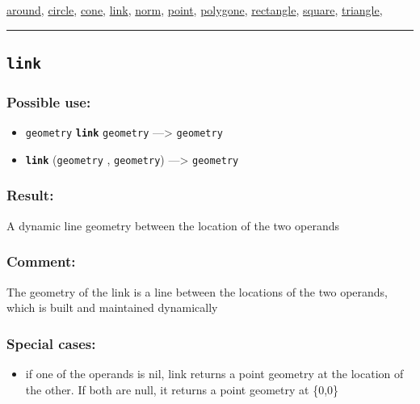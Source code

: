 \documentclass[]{book}
\providecommand{\tightlist}{%
  \setlength{\itemsep}{0pt}\setlength{\parskip}{0pt}}
\theoremstyle{definition}
\theoremstyle{definition}
\theoremstyle{definition}
\theoremstyle{remark}
\begin{document}
\href{OperatorsAA\#around}{around}, \href{OperatorsBC\#circle}{circle},
\href{OperatorsBC\#cone}{cone}, \href{OperatorsIM\#link}{link},
\href{OperatorsNR\#norm}{norm}, \href{OperatorsNR\#point}{point},
\href{OperatorsSZ\#polygone}{polygone},
\href{OperatorsNR\#rectangle}{rectangle},
\href{OperatorsSZ\#square}{square},
\href{OperatorsSZ\#triangle}{triangle},

\begin{center}\rule{0.5\linewidth}{\linethickness}\end{center}

\subsection{\texorpdfstring{\texttt{link}}{link}}\label{link}

\subsubsection{Possible use:}\label{possible-use-322}

\begin{itemize}
\tightlist
\item
  \texttt{geometry} \textbf{\texttt{link}} \texttt{geometry}
  ---\textgreater{} \texttt{geometry}
\item
  \textbf{\texttt{link}} (\texttt{geometry} , \texttt{geometry})
  ---\textgreater{} \texttt{geometry}
\end{itemize}

\subsubsection{Result:}\label{result-312}

A dynamic line geometry between the location of the two operands

\subsubsection{Comment:}\label{comment-60}

The geometry of the link is a line between the locations of the two
operands, which is built and maintained dynamically

\subsubsection{Special cases:}\label{special-cases-89}

\begin{itemize}
\tightlist
\item
  if one of the operands is nil, link returns a point geometry at the
  location of the other. If both are null, it returns a point geometry
  at \{0,0\}
\end{itemize}
\end{document}
